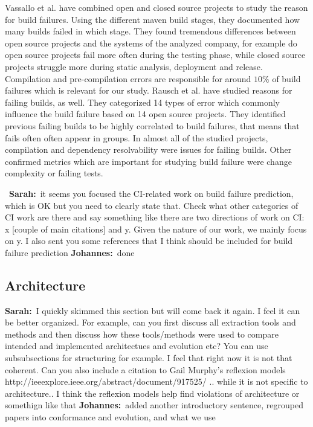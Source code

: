 \documentclass[sigplan, anonymous, review]{acmart}
\newcommand{\sn}[1]{{\color{blue}\textbf{Sarah:}~#1}}
\newcommand{\jk}[1]{{\color{violet}\textbf{Johannes:}~#1}}
\begin{document}
Vassallo et al. \cite{CIFailTypes} have combined open and closed source projects to study the reason for build failures. Using the different maven build stages, they documented how many builds failed in which stage. They found tremendous differences between open source projects and the systems of the analyzed company, for example do open source projects fail more often during the testing phase, while closed source projects struggle more during static analysis, deployment and release. Compilation and pre-compilation errors are responsible for around $10\%$ of build failures which is relevant for our study.
Rausch et al. \cite{FailsinCIFlow} have studied reasons for failing builds, as well. They categorized 14 types of error which commonly influence the build failure based on 14 open source projects. They identified previous failing builds to be highly correlated to build failures, that means that fails often often appear in groups. In almost all of the studied projects, compilation and dependency resolvability were issues for failing builds. Other confirmed metrics which are important for studying build failure were change complexity or failing tests.

~\sn{it seems you focused the CI-related work on build failure prediction, which is OK but you need to clearly state that. Check what other categories of CI work are there and say something like there are two directions of work on CI: x [couple of main citations] and y. Given the nature of our work, we mainly focus on y. I also sent you some references that I think should be included for build failure prediction} \jk{done}

\subsection{Architecture}
\label{sec:relwork-arch}

\sn{I quickly skimmed this section but will come back it again. I feel it can be better organized. For example, can you first discuss all extraction tools and methods and then discuss how these tools/methods were used to compare intended and implemented architectues and evolution etc? You can use subsubsections for structuring for example. I feel that right  now it is not that coherent. Can you also include a citation to Gail Murphy's reflexion models http://ieeexplore.ieee.org/abstract/document/917525/ .. while it is not specific to architecture.. I think the reflexion models help find violations of architecture or somethign like that} \jk{added another introductory sentence, regrouped papers into conformance and evolution, and what we use}
\end{document}
